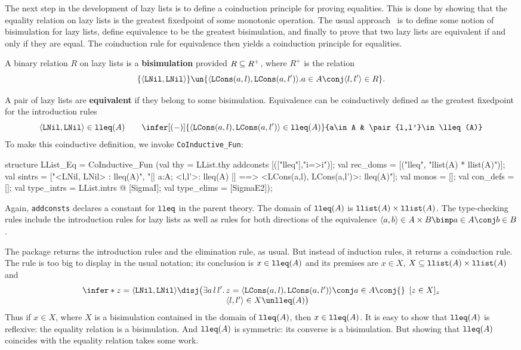 The next step in the development of lazy lists is to define a coinduction
principle for proving equalities.  This is done by showing that the equality
relation on lazy lists is the greatest fixedpoint of some monotonic
operation.  The usual approach~\cite{pitts94} is to define some notion of 
bisimulation for lazy lists, define equivalence to be the greatest
bisimulation, and finally to prove that two lazy lists are equivalent if and
only if they are equal.  The coinduction rule for equivalence then yields a
coinduction principle for equalities.

A binary relation $R$ on lazy lists is a {\bf bisimulation} provided $R\subseteq
R^+$, where $R^+$ is the relation
\[ \{\pair{\LNil,\LNil}\} \un 
   \{\pair{\LCons(a,l),\LCons(a,l')} . a\in A \conj \pair{l,l'}\in R\}.
\]

A pair of lazy lists are {\bf equivalent} if they belong to some bisimulation. 
Equivalence can be coinductively defined as the greatest fixedpoint for the
introduction rules
\[  \pair{\LNil,\LNil} \in\lleq(A)  \qquad 
    \infer[(-)]{\pair{\LCons(a,l),\LCons(a,l')} \in\lleq(A)}
          {a\in A & \pair{l,l'}\in \lleq(A)}
\]
To make this coinductive definition, we invoke \verb|CoInductive_Fun|:
\begin{ttbox}
structure LList_Eq = CoInductive_Fun
(val thy = LList.thy addconsts [(["lleq"],"i=>i")];
 val rec_doms = [("lleq", "llist(A) * llist(A)")];
 val sintrs = 
   ["<LNil, LNil> : lleq(A)",
    "[| a:A; <l,l'>: lleq(A) |] ==> 
     <LCons(a,l), LCons(a,l')>: lleq(A)"];
 val monos = [];
 val con_defs = [];
 val type_intrs = LList.intrs @ [SigmaI];
 val type_elims = [SigmaE2]);
\end{ttbox}
Again, {\tt addconsts} declares a constant for ${\tt lleq}$ in the parent theory. 
The domain of ${\tt lleq}(A)$ is ${\tt llist}(A)\times{\tt llist}(A)$.  The type-checking
rules include the introduction rules for lazy lists as well as rules
for both directions of the equivalence
$\pair{a,b}\in A\times B \bimp a\in A \conj b\in B$.

The package returns the introduction rules and the elimination rule, as
usual.  But instead of induction rules, it returns a coinduction rule.
The rule is too big to display in the usual notation; its conclusion is
$x\in{\tt lleq}(A)$ and its premises are $x\in X$, 
${X\subseteq{\tt llist}(A)\times{\tt llist}(A)}$ and
\[ \infer*{z=\pair{\LNil,\LNil}\disj \bigl(\exists a\,l\,l'.\,
      \begin{array}[t]{@{}l}
        z=\pair{\LCons(a,l),\LCons(a,l')} \conj a\in A \conj{}\\
        \pair{l,l'}\in X\un\lleq(A) \bigr)
      \end{array}  }{[z\in X]_z}
\]
Thus if $x\in X$, where $X$ is a bisimulation contained in the
domain of ${\tt lleq}(A)$, then $x\in{\tt lleq}(A)$.  It is easy to show that
${\tt lleq}(A)$ is reflexive: the equality relation is a bisimulation.  And
${\tt lleq}(A)$ is symmetric: its converse is a bisimulation.  But showing that
${\tt lleq}(A)$ coincides with the equality relation takes some work.

